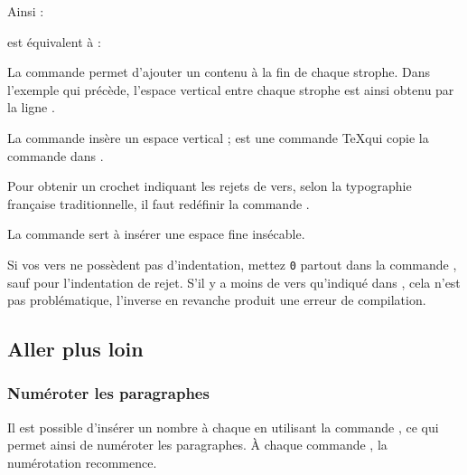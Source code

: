 Ainsi  :
\begin{latexcode}
\setcounter{stanzaindentsrepetition}{2}
\end{latexcode}

est équivalent à :

\begin{latexcode}
\end{latexcode}



La commande  permet d'ajouter un contenu à la fin de chaque strophe.
Dans l'exemple qui précède, l'espace vertical entre chaque  strophe est ainsi obtenu par la ligne 
.
 
La commande  insère un espace vertical ;  est une commande \TeX qui  copie la commande  dans .
\begin{plusloins}
Pour obtenir un crochet indiquant les rejets de vers, selon la typographie française traditionnelle, il faut redéfinir la commande .

\begin{latexcode}
\renewcommand{\hangingsymbol}{[\,}
\end{latexcode}

La commande \csp{,} sert à insérer une espace fine insécable.
\end{plusloins}

Si vos vers ne possèdent pas d'indentation, mettez \verb=0= partout dans la commande , sauf pour l'indentation de rejet. S'il y a moins de vers qu'indiqué dans , cela n'est pas problématique, l'inverse en revanche produit une erreur de compilation.



\subsection{Aller plus loin}

\subsubsection{Numéroter les paragraphes}

Il est possible d'insérer un nombre à chaque  en utilisant la commande \label{numberpstarttrue}, ce qui permet ainsi de numéroter les paragraphes. À chaque commande , la numérotation recommence.

